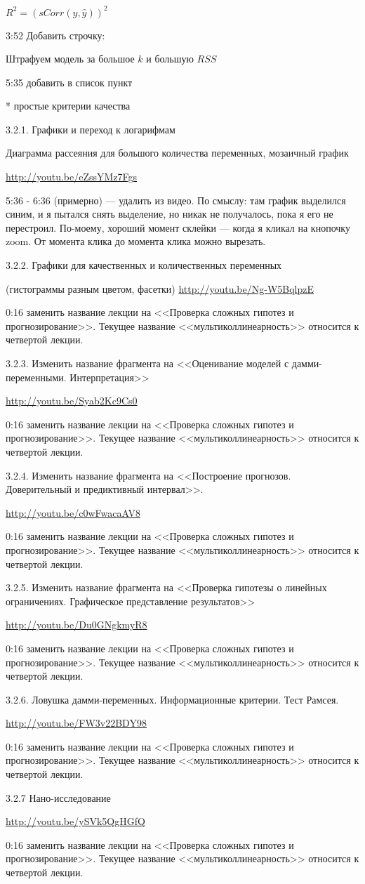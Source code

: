 \documentclass[12pt,a4paper]{article}
\begin{document}
$R^2=(sCorr(y,\hat{y}))^2$


3:52 Добавить строчку:

Штрафуем модель за большое $k$ и большую $RSS$

5:35 добавить в список пункт

* простые критерии качества 



3.2.1. Графики и переход к логарифмам

Диаграмма рассеяния для большого количества переменных, мозаичный график

\url{http://youtu.be/eZssYMz7Fgs}

5:36 - 6:36 (примерно) --- удалить из видео. По смыслу: там график выделился синим, и я пытался снять выделение, но никак не получалось, пока я его не перестроил. По-моему, хороший момент склейки --- когда я кликал на кнопочку zoom. От момента клика до момента клика можно вырезать.

3.2.2. Графики для качественных и количественных переменных 

(гистограммы разным цветом, фасетки)
\url{http://youtu.be/Ng-W5BqlpzE}

0:16 заменить название лекции на <<Проверка сложных гипотез и прогнозирование>>. Текущее название <<мультиколлинеарность>> относится к четвертой лекции.


3.2.3. Изменить название фрагмента на <<Оценивание моделей с дамми-переменными. Интерпретация>>

\url{http://youtu.be/Syab2Kc9Cs0}

0:16 заменить название лекции на <<Проверка сложных гипотез и прогнозирование>>. Текущее название <<мультиколлинеарность>> относится к четвертой лекции.


3.2.4. Изменить название фрагмента на <<Построение прогнозов. Доверительный и предиктивный интервал>>.

\url{http://youtu.be/c0wFwacaAV8}

0:16 заменить название лекции на <<Проверка сложных гипотез и прогнозирование>>. Текущее название <<мультиколлинеарность>> относится к четвертой лекции.


3.2.5. Изменить название фрагмента на <<Проверка гипотезы о линейных ограничениях. Графическое представление результатов>>

\url{http://youtu.be/Du0GNgkmyR8}

0:16 заменить название лекции на <<Проверка сложных гипотез и прогнозирование>>. Текущее название <<мультиколлинеарность>> относится к четвертой лекции.

3.2.6. Ловушка дамми-переменных. Информационные критерии. Тест Рамсея.

\url{http://youtu.be/FW3v22BDY98}

0:16 заменить название лекции на <<Проверка сложных гипотез и прогнозирование>>. Текущее название <<мультиколлинеарность>> относится к четвертой лекции.

3.2.7 Нано-исследование

\url{http://youtu.be/ySVk5QgHGfQ}

0:16 заменить название лекции на <<Проверка сложных гипотез и прогнозирование>>. Текущее название <<мультиколлинеарность>> относится к четвертой лекции.
\end{document}

